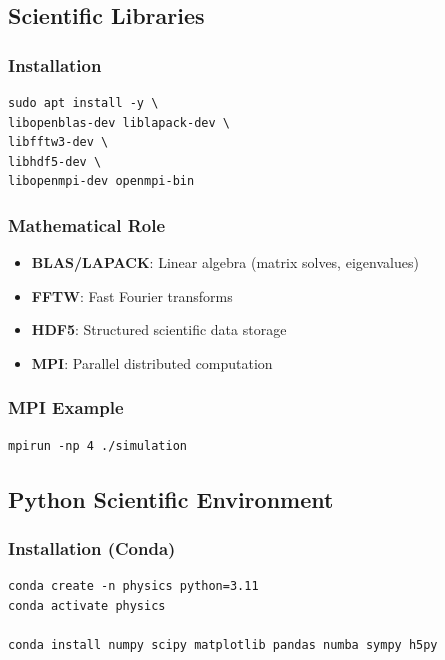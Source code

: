 \subsection{Scientific Libraries}

\subsubsection{Installation}

\begin{lstlisting}
sudo apt install -y \
libopenblas-dev liblapack-dev \
libfftw3-dev \
libhdf5-dev \
libopenmpi-dev openmpi-bin
\end{lstlisting}

\subsubsection{Mathematical Role}

\begin{itemize}
    \item \textbf{BLAS/LAPACK}: Linear algebra (matrix solves, eigenvalues)
    \item \textbf{FFTW}: Fast Fourier transforms
    \item \textbf{HDF5}: Structured scientific data storage
    \item \textbf{MPI}: Parallel distributed computation
\end{itemize}

\subsubsection{MPI Example}

\begin{lstlisting}
mpirun -np 4 ./simulation
\end{lstlisting}

\subsection{Python Scientific Environment}

\subsubsection{Installation (Conda)}

\begin{lstlisting}
conda create -n physics python=3.11
conda activate physics

conda install numpy scipy matplotlib pandas numba sympy h5py
\end{lstlisting}

